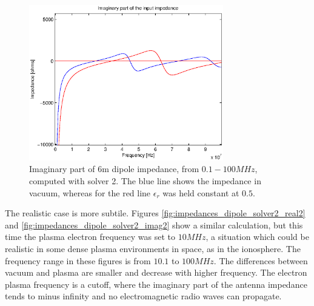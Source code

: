 \documentclass[two-column,ras]{agutex}
\begin{document}
\begin{article}
\begin{figure}
\noindent\includegraphics[width=20pc]{imps_dipole_solver2_imag.eps}
\caption{Imaginary part of 6m dipole impedance, from $0.1 - 100 MHz$, computed with solver 2. The blue line shows the impedance in vacuum, whereas for the red line $\epsilon_r$ was held constant at $0.5$.}
\label{fig:impedances_dipole_solver2_imag}
\end{figure}

The realistic case is more subtile. Figures \ref{fig:impedances_dipole_solver2_real2} and \ref{fig:impedances_dipole_solver2_imag2} show a similar calculation, but this time the plasma electron frequency was set to $10MHz$, a situation which could be realistic in some dense plasma environments in space, as in the ionosphere. The frequency range in these figures is from $10.1$ to $100MHz$. The differences between vacuum and plasma are smaller and decrease with higher frequency. The electron plasma frequency is a cutoff, where the imaginary part of the antenna impedance tends to minus infinity and no electromagnetic radio waves can propagate.


\end{article}
\end{document}
